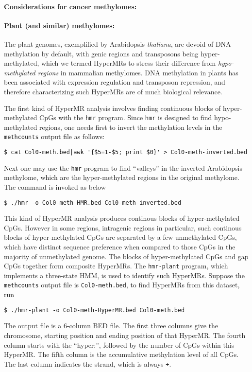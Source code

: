 \documentclass[10pt]{article}
\newcommand{\prog}[1]{\texttt{#1}}
\newcommand{\fn}[1]{\texttt{#1}}
\newcommand{\lit}[1]{\texttt{#1}}
\begin{document}

\paragraph{Considerations for cancer methylomes:}

\paragraph{Plant (and similar) methylomes:} The plant genomes,
exemplified by Arabidopsis \textit{thaliana}, are devoid of DNA
methylation by default, with genic regions and transposons being
hyper-methylated, which we termed HyperMRs to stress their difference
from \textit{hypo-methylated regions} in mammalian methylomes. DNA
methylation in plants has been associated with expression regulation
and transposon repression, and therefore characterizing such HyperMRs
are of much biological relevance.

The first kind of HyperMR analysis involves finding continuous blocks
of hyper-methylated CpGs with the \prog{hmr} program. Since \prog{hmr}
is designed to find hypo-methylated regions, one needs first to invert
the methylation levels in the \prog{methcounts} output file as
follows:
\begin{verbatim}
$ cat Col0-meth.bed|awk '{$5=1-$5; print $0}' > Col0-meth-inverted.bed
\end{verbatim}
Next one may use the \prog{hmr} program to find ``valleys'' in the
inverted Arabidopsis methylome, which are the hyper-methylated regions
in the original methylome. The command is invoked as below
\begin{verbatim}
$ ./hmr -o Col0-meth-HMR.bed Col0-meth-inverted.bed
\end{verbatim}

This kind of HyperMR analysis produces continous blocks of
hyper-methylated CpGs. However in some regions, intragenic regions in
particular, such continous blocks of hyper-methylated CpGs are
separated by a few unmethylated CpGs, which have distinct sequence
preference when compared to those CpGs in the majority of unmethylated
genome. The blocks of hyper-methylated CpGs and gap CpGs together form
composite HyperMRs. The \prog{hmr-plant} program, which implements a
three-state HMM, is used to identify such HyperMRs. Suppose the
\prog{methcounts} output file is  \fn{Col0-meth.bed}, to find HyperMRs
from this dataset, run
\begin{verbatim}
$ ./hmr-plant -o Col0-meth-HyperMR.bed Col0-meth.bed
\end{verbatim}
The output file is a 6-column BED file. The first three columns give
the chromosome, starting position and ending position of that
HyperMR. The fourth column starts with the ``hyper:'', followed by the
number of CpGs within this HyperMR. The fifth column is the
accumulative methylation level of all CpGs. The last column indicates
the strand, which is always \lit{+}.
\end{document}
